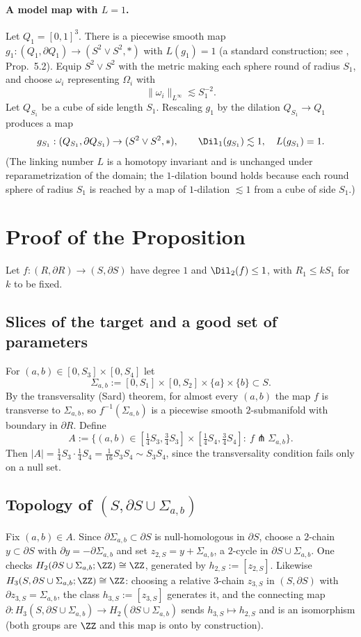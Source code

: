 \paragraph{A model map with $L=1$.}
Let $Q_1=[0,1]^3$. There is a piecewise smooth map $g_1:(Q_1,\partial Q_1)\to(S^2\vee S^2,*)$ with $L(g_1)=1$ (a standard construction; see \cite{GH}, Prop.\ 5.2). Equip $S^2\vee S^2$ with the metric making each sphere round of radius $S_1$, and choose $\omega_i$ representing $\Omega_i$ with
\[
\|\omega_i\|_{L^\infty}\lesssim S_1^{-2}.
\]
Let $Q_{S_1}$ be a cube of side length $S_1$. Rescaling $g_1$ by the dilation $Q_{S_1}\to Q_1$ produces a map
\[
g_{S_1}:(Q_{S_1},\partial Q_{S_1})\to(S^2\vee S^2,*),\qquad \Dil_1(g_{S_1})\lesssim 1,\quad L(g_{S_1})=1 .
\]
(The linking number $L$ is a homotopy invariant and is unchanged under reparametrization of the domain; the $1$-dilation bound holds because each round sphere of radius $S_1$ is reached by a map of $1$-dilation $\lesssim 1$ from a cube of side $S_1$.)

\section{Proof of the Proposition}

Let $f:(R,\partial R)\to(S,\partial S)$ have degree $1$ and $\Dil_2(f)\le1$, with $R_1\le kS_1$ for $k$ to be fixed.

\subsection*{Slices of the target and a good set of parameters}
For $(a,b)\in[0,S_3]\times[0,S_4]$ let
\[
\Sigma_{a,b}:=[0,S_1]\times[0,S_2]\times\{a\}\times\{b\}\subset S .
\]
By the transversality (Sard) theorem, for almost every $(a,b)$ the map $f$ is transverse to $\Sigma_{a,b}$, so $f^{-1}(\Sigma_{a,b})$ is a piecewise smooth $2$-submanifold with boundary in $\partial R$. Define
\[
A:=\Big\{(a,b)\in[\tfrac14S_3,\tfrac34S_3]\times[\tfrac14S_4,\tfrac34S_4]:\ f\pitchfork\Sigma_{a,b}\Big\}.
\]
Then $|A|=\tfrac14 S_3\cdot\tfrac14 S_4=\tfrac1{16}S_3S_4\sim S_3S_4$, since the transversality condition fails only on a null set.

\subsection*{Topology of $(S,\partial S\cup\Sigma_{a,b})$}
Fix $(a,b)\in A$. Since $\partial\Sigma_{a,b}\subset\partial S$ is null-homologous in $\partial S$, choose a $2$-chain $y\subset\partial S$ with $\partial y=-\partial\Sigma_{a,b}$ and set $z_{2,S}=y+\Sigma_{a,b}$, a $2$-cycle in $\partial S\cup\Sigma_{a,b}$. One checks $H_2(\partial S\cup\Sigma_{a,b};\ZZ)\cong\ZZ$, generated by $h_{2,S}:=[z_{2,S}]$. Likewise $H_3(S,\partial S\cup\Sigma_{a,b};\ZZ)\cong\ZZ$: choosing a relative $3$-chain $z_{3,S}$ in $(S,\partial S)$ with $\partial z_{3,S}=\Sigma_{a,b}$, the class $h_{3,S}:=[z_{3,S}]$ generates it, and the connecting map $\partial:H_3(S,\partial S\cup\Sigma_{a,b})\to H_2(\partial S\cup\Sigma_{a,b})$ sends $h_{3,S}\mapsto h_{2,S}$ and is an isomorphism (both groups are $\ZZ$ and this map is onto by construction).

